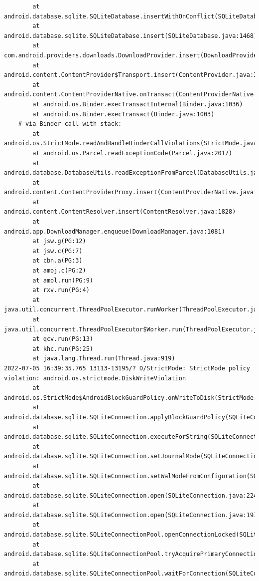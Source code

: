 \documentclass[a4paper,12pt]{book}
\begin{document}
\begin{lstlisting}
        at android.database.sqlite.SQLiteDatabase.insertWithOnConflict(SQLiteDatabase.java:1597)
        at android.database.sqlite.SQLiteDatabase.insert(SQLiteDatabase.java:1468)
        at com.android.providers.downloads.DownloadProvider.insert(DownloadProvider.java:972)
        at android.content.ContentProvider$Transport.insert(ContentProvider.java:309)
        at android.content.ContentProviderNative.onTransact(ContentProviderNative.java:154)
        at android.os.Binder.execTransactInternal(Binder.java:1036)
        at android.os.Binder.execTransact(Binder.java:1003)
    # via Binder call with stack:
        at android.os.StrictMode.readAndHandleBinderCallViolations(StrictMode.java:2289)
        at android.os.Parcel.readExceptionCode(Parcel.java:2017)
        at android.database.DatabaseUtils.readExceptionFromParcel(DatabaseUtils.java:137)
        at android.content.ContentProviderProxy.insert(ContentProviderNative.java:481)
        at android.content.ContentResolver.insert(ContentResolver.java:1828)
        at android.app.DownloadManager.enqueue(DownloadManager.java:1081)
        at jsw.g(PG:12)
        at jsw.c(PG:7)
        at cbn.a(PG:3)
        at amoj.c(PG:2)
        at amol.run(PG:9)
        at rxv.run(PG:4)
        at java.util.concurrent.ThreadPoolExecutor.runWorker(ThreadPoolExecutor.java:1167)
        at java.util.concurrent.ThreadPoolExecutor$Worker.run(ThreadPoolExecutor.java:641)
        at qcv.run(PG:13)
        at khc.run(PG:25)
        at java.lang.Thread.run(Thread.java:919)
2022-07-05 16:39:35.765 13113-13195/? D/StrictMode: StrictMode policy violation: android.os.strictmode.DiskWriteViolation
        at android.os.StrictMode$AndroidBlockGuardPolicy.onWriteToDisk(StrictMode.java:1527)
        at android.database.sqlite.SQLiteConnection.applyBlockGuardPolicy(SQLiteConnection.java:1140)
        at android.database.sqlite.SQLiteConnection.executeForString(SQLiteConnection.java:733)
        at android.database.sqlite.SQLiteConnection.setJournalMode(SQLiteConnection.java:376)
        at android.database.sqlite.SQLiteConnection.setWalModeFromConfiguration(SQLiteConnection.java:316)
        at android.database.sqlite.SQLiteConnection.open(SQLiteConnection.java:224)
        at android.database.sqlite.SQLiteConnection.open(SQLiteConnection.java:197)
        at android.database.sqlite.SQLiteConnectionPool.openConnectionLocked(SQLiteConnectionPool.java:505)
        at android.database.sqlite.SQLiteConnectionPool.tryAcquirePrimaryConnectionLocked(SQLiteConnectionPool.java:949)
        at android.database.sqlite.SQLiteConnectionPool.waitForConnection(SQLiteConnectionPool.java:699)

\end{lstlisting}
\end{document}
